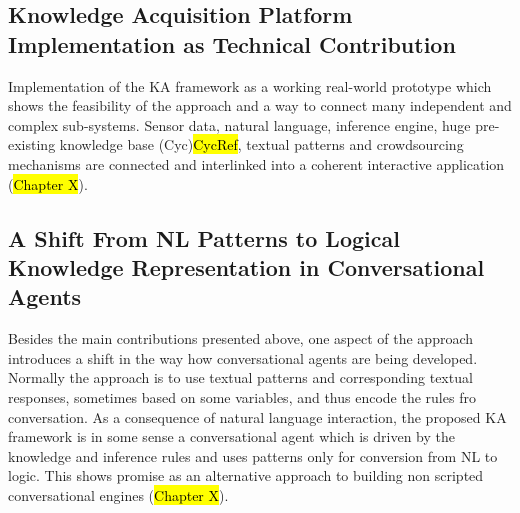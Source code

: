 \subsection{Knowledge Acquisition Platform Implementation as Technical Contribution }
Implementation of the KA framework as a working real-world prototype which shows the feasibility of the approach and a way to connect many independent and complex sub-systems. Sensor data, natural language, inference engine, huge pre-existing knowledge base (Cyc)\hl{CycRef}, textual patterns and crowdsourcing mechanisms are connected and interlinked into a coherent interactive application (\hl{Chapter X}).

\subsection{A Shift From NL Patterns to Logical Knowledge Representation in Conversational Agents}
Besides the main contributions presented above, one aspect of the approach introduces a shift in the way how conversational agents are being developed. Normally the approach is to use textual patterns and corresponding textual responses, sometimes based on some variables, and thus encode the rules fro conversation. As a consequence of natural language interaction, the proposed KA framework is in some sense a conversational agent which is driven by the knowledge and inference rules and uses patterns only for conversion from NL to logic. This shows promise as an alternative approach to building non scripted conversational engines (\hl{Chapter X}).